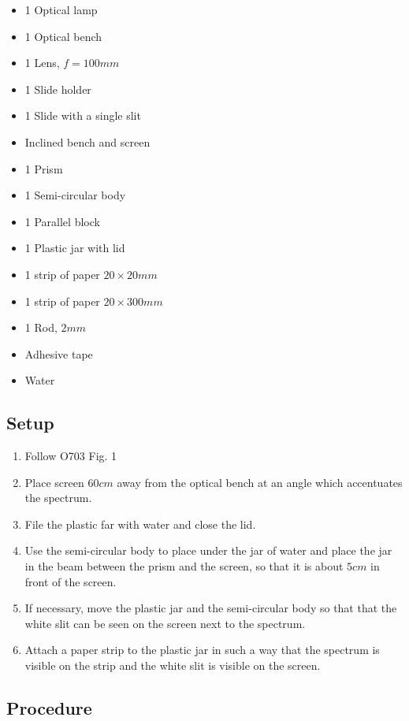 \documentclass[12pt]{article}
\begin{document}
\begin{itemize}
\item 1 Optical lamp
\item 1 Optical bench
\item 1 Lens, $f=100 mm$
\item 1 Slide holder
\item 1 Slide with a single slit
\item Inclined bench and screen
\item 1 Prism
\item 1 Semi-circular body
\item 1 Parallel block
\item 1 Plastic jar with lid
\item 1 strip of paper $20\times20 mm$
\item 1 strip of paper $20 \times 300 mm$
\item 1 Rod, $2mm$
\item Adhesive tape
\item Water
\end{itemize}



\subsection*{Setup}


\begin{enumerate}
\item Follow O703 Fig. 1
\item Place screen $60 cm $ away from the optical bench at an angle which accentuates the spectrum.
\item File the plastic far with water and close the lid.
\item Use the semi-circular body to place under the jar of water and place the jar in the beam between the prism and the screen, so that it is about $5cm$ in front of the screen.
\item If necessary, move the plastic jar and the semi-circular body so that that the white slit can be seen on the screen next to the spectrum.
\item Attach a paper strip to the plastic jar in such a way that the spectrum is visible on the strip and the white slit is visible on the screen.
\end{enumerate}

\subsection*{Procedure}
\end{document}
